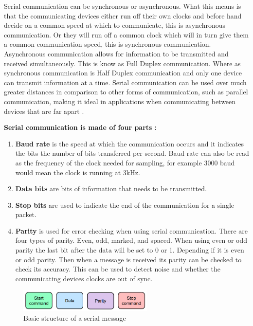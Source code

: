 Serial communication can be synchronous or asynchronous. What this means is that the communicating devices either run off their own clocks and before hand decide on a common speed at which to communicate, this is asynchronous communication.  Or they will run off a common clock which will in turn give them a common communication speed,  this is synchronous communication. Asynchronous communication allows for information to be transmitted and received simultaneously. This is know as Full Duplex communication. Where as synchronous communication is Half Duplex communication and only one device can transmit information at a time. Serial communication can be used over much greater distances in comparison to other forms of communication, such as parallel communication, making it ideal in applications when communicating between devices that are far apart . 

\textbf{Serial communication is made of four parts :}
\begin{enumerate}
\item{\textbf{Baud rate}}
is the speed at which the communication occurs and it indicates the bits the number of bits transferred per second. Baud rate can also be read as the frequency of the clock needed for sampling, for example 3000 baud would mean the clock is running at 3kHz.
\item{\textbf{Data bits}}
are bits of information that needs to be transmitted.
\item{\textbf{Stop bits}}
are used to indicate the end of the communication for a single packet.
\item{\textbf{Parity}}
is used for error checking when using serial communication. There are four types of parity. Even, odd, marked, and spaced. When using even or odd parity the last bit after the data will be set to 0 or 1. Depending if it is even or odd parity. Then when a message is received its parity can be checked to check its accuracy. This can be used to detect noise and whether the communicating devices clocks are out of sync.

\end{enumerate}
\begin{figure}[H]
\centering
\includegraphics[width=0.6\textwidth]{serial.png}
\caption{Basic structure of a serial message}
\end{figure}

